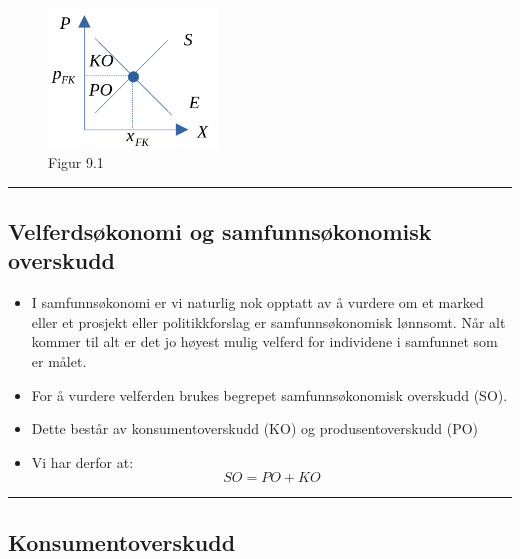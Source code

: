 \documentclass[
  letterpaper,
  DIV=11,
  numbers=noendperiod]{scrartcl}
\providecommand{\tightlist}{%
  \setlength{\itemsep}{0pt}\setlength{\parskip}{0pt}}\usepackage{longtable,booktabs,array}
\begin{document}
\begin{figure}[H]

{\centering \includegraphics[width=0.4\textwidth,height=\textheight]{drawio/markl.png}

}

\caption{Figur 9.1}

\end{figure}%

\begin{center}\rule{0.5\linewidth}{0.5pt}\end{center}

\subsection{Velferdsøkonomi og samfunnsøkonomisk
overskudd}\label{velferdsuxf8konomi-og-samfunnsuxf8konomisk-overskudd}

\begin{itemize}
\tightlist
\item
  I samfunnsøkonomi er vi naturlig nok opptatt av å vurdere om et marked
  eller et prosjekt eller politikkforslag er samfunnsøkonomisk lønnsomt.
  Når alt kommer til alt er det jo høyest mulig velferd for individene i
  samfunnet som er målet.
\item
  For å vurdere velferden brukes begrepet samfunnsøkonomisk overskudd
  (SO).
\item
  Dette består av konsumentoverskudd (KO) og produsentoverskudd (PO)
\item
  Vi har derfor at: \begin{equation*}
  SO=PO+KO
  \end{equation*}
\end{itemize}

\begin{center}\rule{0.5\linewidth}{0.5pt}\end{center}

\subsection{Konsumentoverskudd}\label{konsumentoverskudd-1}
\end{document}
